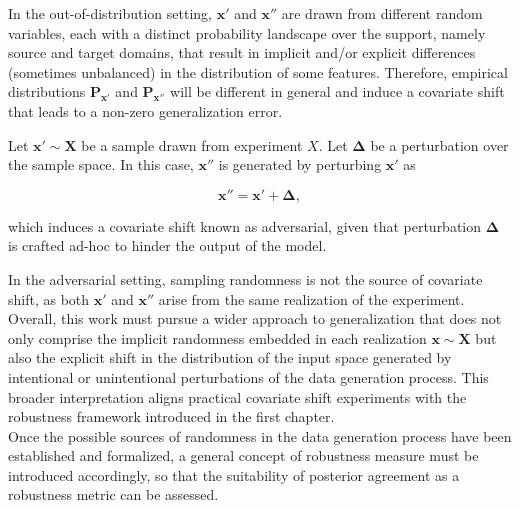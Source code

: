 In the out-of-distribution setting, $\bm{x}'$ and $\bm{x}''$ are
drawn from different random variables, each with a distinct probability 
landscape over the support, namely source and target domains, that result 
in implicit and/or explicit differences (sometimes unbalanced) in the distribution of some features.
Therefore, empirical distributions $\mathbf{P}_{\bm{x}'}$ and $\mathbf{P}_{\bm{x}''}$ will
be different in general and induce a covariate shift that leads
to a non-zero generalization error.

\begin{definition}
    Let $\bm{x}' \sim \bm{X}$ be a sample drawn from experiment
    $X$. Let $\bm{\Delta}$ be a perturbation over
    the sample space. In this case, $\bm{x}''$ is generated by perturbing $\bm{x}'$ as

    $$
    \bm{x}'' = \bm{x}' + \bm{\Delta},
    $$

    which induces a covariate shift known as adversarial, given that
    perturbation $\bm{\Delta}$ is crafted ad-hoc to hinder the 
    output of the model.
\end{definition}

In the adversarial setting, sampling randomness is not the source of
covariate shift, as both $\bm{x}'$ and $\bm{x}''$ arise from
the same realization of the experiment. \\

Overall, this work must pursue a wider approach to generalization  
that does not only comprise the implicit
randomness embedded in each realization $\bm{x} \sim \bm{X}$
but also the explicit shift in the distribution of the input space
generated by intentional or unintentional perturbations of the 
data generation process. This broader interpretation aligns practical
covariate shift experiments with the robustness framework
introduced in the first chapter.\\

Once the possible sources of randomness in the data 
generation process have been established and formalized, 
a general concept of robustness measure must be introduced 
accordingly, so that the suitability of posterior agreement
as a robustness metric can be assessed.

